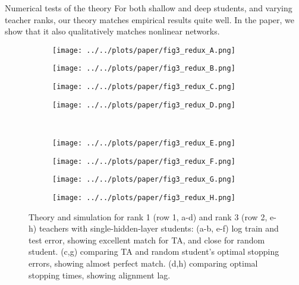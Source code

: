 \documentclass[final]{beamer}
\begin{document}
\begin{frame}[t]{}
\begin{columns}
\begin{column}[t]{0.248\textwidth}
\begin{block}{\large Numerical tests of the theory}
\vspace{-0.5em}
For both shallow and deep students, and varying teacher ranks, our theory matches empirical results quite well. In the paper, we show that it also qualitatively matches nonlinear networks. 
\begin{figure}
\centering
\begin{subfigure}[t]{0.2\textwidth}
\texttt{[image: ../../plots/paper/fig3\_redux\_A.png]}
\label{fig_3a}
\end{subfigure}%
\begin{subfigure}[t]{0.285\textwidth}
\texttt{[image: ../../plots/paper/fig3\_redux\_B.png]}
\label{fig_3b}
\end{subfigure}%
\begin{subfigure}[t]{0.2\textwidth}
\texttt{[image: ../../plots/paper/fig3\_redux\_C.png]}
\label{fig_3c}
\end{subfigure}%
\begin{subfigure}[t]{0.2\textwidth}
\texttt{[image: ../../plots/paper/fig3\_redux\_D.png]}
\label{fig_3d}
\end{subfigure}\\[-1em]
\begin{subfigure}[t]{0.2\textwidth}
\texttt{[image: ../../plots/paper/fig3\_redux\_E.png]}
\label{fig_3e}
\end{subfigure}%
\begin{subfigure}[t]{0.285\textwidth}
\texttt{[image: ../../plots/paper/fig3\_redux\_F.png]}
\label{fig_3f}
\end{subfigure}%
\begin{subfigure}[t]{0.2\textwidth}
\texttt{[image: ../../plots/paper/fig3\_redux\_G.png]}
\label{fig_3g}
\end{subfigure}%
\begin{subfigure}[t]{0.2\textwidth}
\texttt{[image: ../../plots/paper/fig3\_redux\_H.png]}
\label{fig_3h}
\end{subfigure}
\vspace{-1em}
\caption{Theory and simulation for rank 1 (row 1, a-d) and rank 3 (row 2, e-h) teachers with single-hidden-layer students: (a-b, e-f) log train and test error, showing excellent match for TA, and close for random student. (c,g) comparing TA and random student's optimal stopping errors, showing almost perfect match. (d,h)  comparing optimal stopping times, showing alignment lag.}
\vspace{-0.5em}
\label{gen_results_fig}
\end{figure}


\end{block}
\end{column}
\end{columns}
\end{frame}
\end{document}
